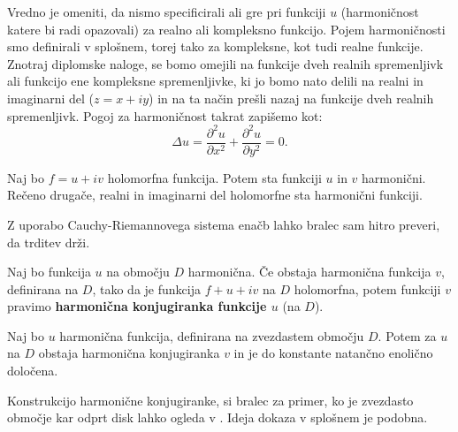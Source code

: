 \documentclass[mat1]{fmfdelo}
\begin{document}
    \begin{opomba}
        Vredno je omeniti, da nismo specificirali ali gre pri funkciji $u$ (harmoničnost katere bi radi opazovali) za realno ali kompleksno funkcijo. 
        Pojem harmoničnosti smo definirali v splošnem, torej tako za kompleksne, kot tudi realne funkcije.
        Znotraj diplomske naloge, se bomo omejili na funkcije dveh realnih spremenljivk ali funkcijo ene kompleksne spremenljivke, ki jo bomo nato delili na realni in imaginarni del ($z = x + iy $) in na ta način prešli nazaj na funkcije dveh realnih spremenljivk.
        \newline
        Pogoj za harmoničnost takrat zapišemo kot: 
            $$
                \Delta u = \frac{\partial^2 u}{\partial x ^ 2} +  \frac{\partial^2 u}{\partial y ^ 2}= 0.
            $$
    \end{opomba}
    \begin{trditev}
        \label{hh}
        Naj bo $f = u + iv$ holomorfna funkcija. Potem sta funkciji $u$ in $v$ harmonični. Rečeno drugače, realni in imaginarni del holomorfne sta harmonični funkciji. 
    \end{trditev}
    \begin{dokaz}
        Z uporabo Cauchy-Riemannovega sistema enačb lahko bralec sam hitro preveri, da trditev drži.
    \end{dokaz}

    \begin{definicija}
        Naj bo funkcija $u$ na območju $D$ harmonična. Če obstaja harmonična funkcija $v$, definirana na $D$, tako da je funkcija $f + u + iv$ na $D$ holomorfna, potem funkciji $v$ pravimo \textbf{harmonična konjugiranka funkcije $u$} (na $D$).    
    \end{definicija}

    \begin{trditev}
        Naj bo $u$ harmonična funkcija, definirana na zvezdastem območju $D$. Potem za $u$ na $D$ obstaja harmonična konjugiranka $v$ in je do konstante natančno enolično določena. 
    \end{trditev}
    \begin{dokaz}
        Konstrukcijo harmonične konjugiranke, si bralec za primer, ko je zvezdasto območje kar odprt disk lahko ogleda v \cite{osnova}. 
        Ideja dokaza v splošnem je podobna. 
    \end{dokaz}
\end{document}
